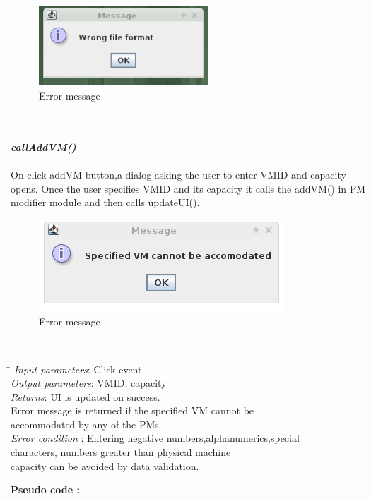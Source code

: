 \documentclass[a4paper,11pt]{article}
\begin{document}
\begin{figure}[h]
 \centering
 \includegraphics[height=3cm]{images/7.png}
 \caption{Error message}
\end{figure}
\pagebreak
\mbox{}\\\\
\emph{\bf callAddVM()}\\\\
 On click addVM button,a dialog asking the user to enter VM\textunderscore ID and  capacity opens.
  Once the user specifies VM\textunderscore ID and its capacity it calls the addVM() in PM modifier module and then calls updateUI().
  \\
  \begin{figure}[ht!]
 \centering
 \includegraphics[scale=0.5, angle=0]{images/8.png}
 \caption{Error message}
\end{figure}
\pagebreak
\\
  \begin{tabbing}
  \hspace*{4cm}\= \kill
  \emph{Input parameters}\>: Click event\\
\emph{Output parameters}\>: VM\textunderscore ID, capacity\\
\emph{Returns}\>: UI is updated on success. \\ \> Error message is returned if the specified VM cannot be \\ \> accommodated by any of the PMs.\\
\emph{Error condition} \>: Entering negative numbers,alphanumerics,special \\ \> characters, numbers greater than  physical machine \\ \>capacity can be avoided by data validation.
 \\
 \end{tabbing}
  \textbf{Pseudo code :}
\end{document}
